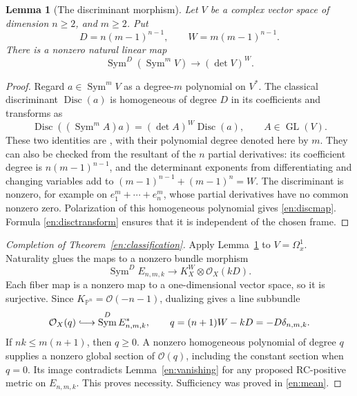 \documentclass[12pt]{amsart}
\newtheorem{lem}[thm]{Lemma}
\theoremstyle{definition}
\theoremstyle{remark}
\numberwithin{equation}{section}
\newcommand{\GL}{\operatorname{GL}}
\DeclareMathOperator{\Sym}{Sym}
\DeclareMathOperator{\Disc}{Disc}
\newcommand{\E}{E_{n,m,k}}
\newcommand{\Pp}{\mathbb P}
\newcommand{\cst}{\delta_{n,m,k}}
\newcommand{\eref}[1]{\eqref{en:#1}}
\begin{document}
\begin{lem}[The discriminant morphism]\label{en:discriminant}
Let $V$ be a complex vector space of dimension $n\ge2$, and $m\ge2$. Put
\begin{equation}\label{en:weights}
D=n(m-1)^{n-1},\qquad W=m(m-1)^{n-1}.
\end{equation}
There is a nonzero natural linear map
\begin{equation}\label{en:discmap}
\Sym^D(\Sym^m V)\longrightarrow(\det V)^W.
\end{equation}
\end{lem}

\begin{proof}
Regard $a\in\Sym^m V$ as a degree-$m$ polynomial on $V^*$. The classical discriminant $\Disc(a)$ is homogeneous of degree $D$ in its coefficients and transforms as
\begin{equation}\label{en:disctransform}
\Disc((\Sym^m A)a)=(\det A)^W\Disc(a),\qquad A\in\GL(V).
\end{equation}
These two identities are \cite[Propositions~4.7(i) and~4.13]{en:BJ}, with their polynomial degree denoted here by $m$. They can also be checked from the resultant of the $n$ partial derivatives: its coefficient degree is $n(m-1)^{n-1}$, and the determinant exponents from differentiating and changing variables add to $(m-1)^{n-1}+(m-1)^n=W$. The discriminant is nonzero, for example on $e_1^m+\cdots+e_n^m$, whose partial derivatives have no common nonzero zero. Polarization of this homogeneous polynomial gives \eref{discmap}. Formula \eref{disctransform} ensures that it is independent of the chosen frame.
\end{proof}

\begin{proof}[Completion of Theorem~\ref{en:classification}]
Apply Lemma~\ref{en:discriminant} to $V=\Omega_x^1$. Naturality glues the maps to a nonzero bundle morphism
\begin{equation}\label{en:bundlemap}
\Sym^D\E\longrightarrow K_X^W\otimes\mathcal O_X(kD).
\end{equation}
Each fiber map is a nonzero map to a one-dimensional vector space, so it is surjective. Since $K_{\Pp^n}=\mathcal O(-n-1)$, dualizing gives a line subbundle
\begin{equation}\label{en:lineobstruction}
\mathcal O_X(q)\lhook\joinrel\longrightarrow\Sym^D\E^*,\qquad
q=(n+1)W-kD=-D\cst.
\end{equation}
If $nk\le m(n+1)$, then $q\ge0$. A nonzero homogeneous polynomial of degree $q$ supplies a nonzero global section of $\mathcal O(q)$, including the constant section when $q=0$. Its image contradicts Lemma~\ref{en:vanishing} for any proposed RC-positive metric on $\E$. This proves necessity. Sufficiency was proved in \eref{mean}.
\end{proof}
\end{document}

